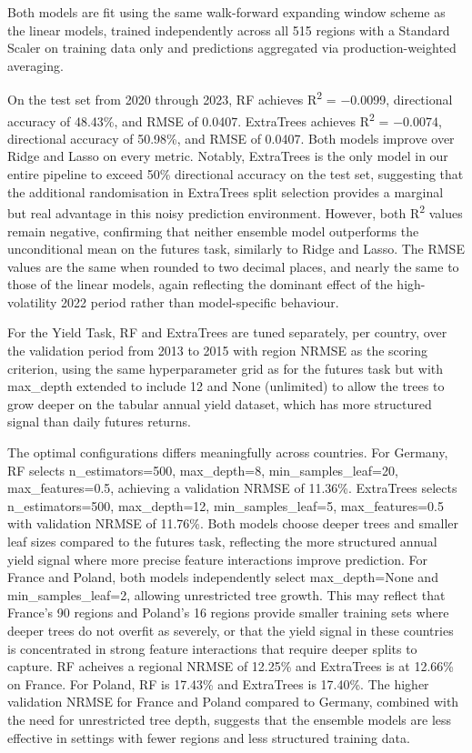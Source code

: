 \documentclass[pdflatex,sn-mathphys-num, oneside]{sn-jnl}%
\theoremstyle{thmstyleone}%
\theoremstyle{thmstyletwo}%
\theoremstyle{thmstylethree}%
\begin{document}
Both models are fit using the same walk-forward expanding window scheme as the linear models, trained independently across all 515 regions with a Standard Scaler on training data only and predictions aggregated via production-weighted averaging.

On the test set from 2020 through 2023, RF achieves R\textsuperscript{2} = −0.0099, directional accuracy of 48.43\%, and RMSE of 0.0407. ExtraTrees achieves R\textsuperscript{2} = −0.0074, directional accuracy of 50.98\%, and RMSE of 0.0407. Both models improve over Ridge and Lasso on every metric. Notably, ExtraTrees is the only model in our entire pipeline to exceed 50\% directional accuracy on the test set, suggesting that the additional randomisation in ExtraTrees split selection provides a marginal but real advantage in this noisy prediction environment. However, both R\textsuperscript{2} values remain negative, confirming that neither ensemble model outperforms the unconditional mean on the futures task, similarly to Ridge and Lasso. The RMSE values are the same when rounded to two decimal places, and nearly the same to those of the linear models, again reflecting the dominant effect of the high-volatility 2022 period rather than model-specific behaviour.

For the Yield Task, RF and ExtraTrees are tuned separately, per country, over the validation period from 2013 to 2015 with region NRMSE as the scoring criterion, using the same hyperparameter grid as for the futures task but with max\_depth extended to include 12 and None (unlimited) to allow the trees to grow deeper on the tabular annual yield dataset, which has more structured signal than daily futures returns.

The optimal configurations differs meaningfully across countries. For Germany, RF selects n\_estimators=500, max\_depth=8, min\_samples\_leaf=20, max\_features=0.5, achieving a validation NRMSE of 11.36\%. ExtraTrees selects n\_estimators=500, max\_depth=12, min\_samples\_leaf=5, max\_features=0.5 with validation NRMSE of 11.76\%. Both models choose deeper trees and smaller leaf sizes compared to the futures task, reflecting the more structured annual yield signal where more precise feature interactions improve prediction. For France and Poland, both models independently select max\_depth=None and min\_samples\_leaf=2, allowing unrestricted tree growth. This may reflect that France's 90 regions and Poland's 16 regions provide smaller training sets where deeper trees do not overfit as severely, or that the yield signal in these countries is concentrated in strong feature interactions that require deeper splits to capture. RF acheives a regional NRMSE of 12.25\% and ExtraTrees is at 12.66\% on France. For Poland, RF is 17.43\% and ExtraTrees is 17.40\%. The higher validation NRMSE for France and Poland compared to Germany, combined with the need for unrestricted tree depth, suggests that the ensemble models are less effective in settings with fewer regions and less structured training data.
\end{document}
